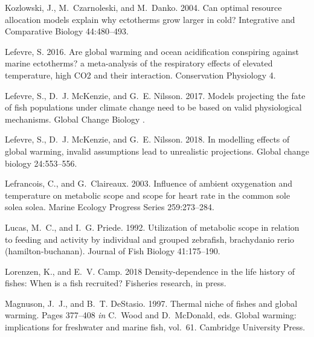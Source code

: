 \documentclass[11pt]{article}\usepackage[]{graphicx}\usepackage[]{color,soul}
\begin{document}
\begin{thebibliography}{62}
Kozlowski, J., M.~Czarnoleski, and M.~Danko. 2004.
\newblock Can optimal resource allocation models explain why ectotherms grow
  larger in cold?
\newblock Integrative and Comparative Biology 44:480--493.

Lefevre, S. 2016.
\newblock Are global warming and ocean acidification conspiring against marine
  ectotherms? a meta-analysis of the respiratory effects of elevated
  temperature, high {CO}2 and their interaction.
\newblock Conservation Physiology 4.

Lefevre, S., D.~J. {McKenzie}, and G.~E. Nilsson. 2017.
\newblock Models projecting the fate of fish populations under climate change
  need to be based on valid physiological mechanisms.
\newblock Global Change Biology .

Lefevre, S., D.~J. McKenzie, and G.~E. Nilsson. 2018.
\newblock In modelling effects of global warming, invalid assumptions lead to
  unrealistic projections.
\newblock Global change biology 24:553--556.

Lefrancois, C., and G.~Claireaux. 2003.
\newblock Influence of ambient oxygenation and temperature on metabolic scope
  and scope for heart rate in the common sole solea solea.
\newblock Marine Ecology Progress Series 259:273--284.

Lucas, M.~C., and I.~G. Priede. 1992.
\newblock Utilization of metabolic scope in relation to feeding and activity by
  individual and grouped zebrafish, brachydanio rerio (hamilton-buchanan).
\newblock Journal of Fish Biology 41:175--190.

Lorenzen, K., and E.~V. Camp. 2018
\newblock Density-dependence in the life history of fishes: When is a fish
  recruited? 
\newblock Fisheries research, in press.

Magnuson, J.~J., and B.~T. {DeStasio}. 1997.
\newblock Thermal niche of fishes and global warming.
\newblock Pages 377--408 \emph{in} C.~Wood and D.~{McDonald}, eds. Global
  warming: implications for freshwater and marine fish, vol.~61. Cambridge
  University Press.


\end{thebibliography}
\end{document}
